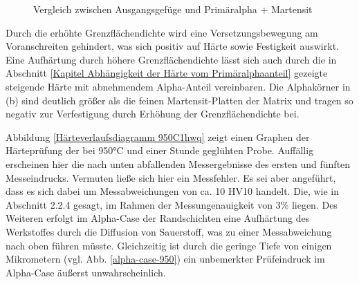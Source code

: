 \documentclass[a4paper, 11pt]{tubsreprt}
\begin{document}
\begin{figure}
\caption{Vergleich zwischen Ausgangsgefüge und Primäralpha + Martensit}
\label{Vergleich Primäralpha martensit}
\end{figure}


Durch die erhöhte Grenzflächendichte wird eine Versetzungsbewegung am Voranschreiten gehindert, was sich positiv auf Härte sowie Festigkeit auswirkt. Eine Aufhärtung durch höhere Grenzflächendichte lässt sich auch durch die in Abschnitt \ref{Kapitel Abhängigkeit der Härte vom Primäralphaanteil} gezeigte steigende Härte mit abnehmendem Alpha-Anteil vereinbaren. Die Alphakörner in (b) sind deutlich größer als die feinen Martensit-Platten der Matrix und tragen so negativ zur Verfestigung durch Erhöhung der Grenzflächendichte bei.

Abbildung \ref{Härteverlaufsdiagramm 950C1hwq} zeigt einen Graphen der Härteprüfung der bei 950°C und einer Stunde geglühten Probe. Auffällig erscheinen hier die nach unten abfallenden Messergebnisse des ersten und fünften Messeindrucks. Vermuten ließe sich hier ein Messfehler. Es sei aber angeführt, dass es sich dabei um Messabweichungen von ca. 10 HV10 handelt. Die, wie in Abschnitt 2.2.4 gesagt, im Rahmen der Messungenauigkeit von 3\% liegen. Des Weiteren erfolgt im Alpha-Case der Randschichten eine Aufhärtung des Werkstoffes durch die Diffusion von Sauerstoff, was zu einer Messabweichung nach oben führen müsste. Gleichzeitig ist durch die geringe Tiefe von einigen Mikrometern (vgl. Abb. \ref{alpha-case-950}) ein unbemerkter Prüfeindruck im Alpha-Case äußerst unwahrscheinlich.
\end{document}
